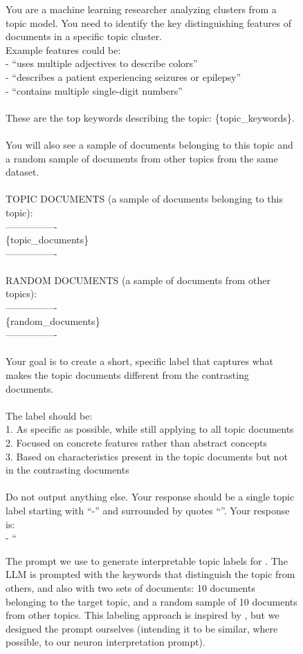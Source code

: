 \begin{figure*}[!htb]
\centering\small
\begin{tcolorbox}[colback=blue!5!white, colframe=blue!75!black, boxrule=0.5mm, arc=4mm, boxsep=5pt, width=\textwidth]
You are a machine learning researcher analyzing clusters from a topic model. You need to identify the key distinguishing features of documents in a specific topic cluster. \\
Example features could be: \\
- ``uses multiple adjectives to describe colors'' \\
- ``describes a patient experiencing seizures or epilepsy'' \\
- ``contains multiple single-digit numbers'' \\
\\
These are the top keywords describing the topic: \{topic\_keywords\}. \\
\\
You will also see a sample of documents belonging to this topic and a random sample of documents from other topics from the same dataset. \\
\\
TOPIC DOCUMENTS (a sample of documents belonging to this topic): \\
---------------- \\
\{topic\_documents\} \\
---------------- \\
\\
RANDOM DOCUMENTS (a sample of documents from other topics): \\
---------------- \\
\{random\_documents\} \\
---------------- \\
\\
Your goal is to create a short, specific label that captures what makes the topic documents different from the contrasting documents. \\
\\
The label should be: \\
1. As specific as possible, while still applying to all topic documents \\
2. Focused on concrete features rather than abstract concepts \\
3. Based on characteristics present in the topic documents but not in the contrasting documents \\
\\
Do not output anything else. Your response should be a single topic label starting with ``-'' and surrounded by quotes ``''. Your response is: \\
- ``
\end{tcolorbox}
\caption{The prompt we use to generate interpretable topic labels for \bertopic. 
The LLM is prompted with the keywords that distinguish the topic from others, and also with two sets of documents: 10 documents belonging to the target topic, and a random sample of 10 documents from other topics.
This labeling approach is inspired by \citet{grootendorst_llm_2024}, but we designed the prompt ourselves (intending it to be similar, where possible, to our neuron interpretation prompt).
}
\label{fig:bertopic_prompt}
\end{figure*}
